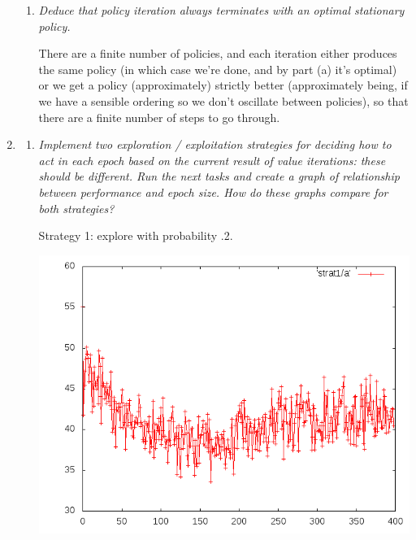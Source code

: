 \documentclass{article}
\begin{document}
\begin{enumerate}
\begin{enumerate}

  \item \emph{Deduce that policy iteration always terminates with an
    optimal stationary policy.}
    
    There are a finite number of policies, and each iteration either
    produces the same policy (in which case we're done, and by part
    (a) it's optimal) or we get a policy (approximately) strictly
    better (approximately being, if we have a sensible ordering so we
    don't oscillate between policies), so that there are a finite
    number of steps to go through.
  \end{enumerate}

\item 
  \begin{enumerate}
  \item \emph{Implement two exploration / exploitation strategies for
    deciding how to act in each epoch based on the current result of
    value iterations: these should be different.  Run the next tasks
    and create a graph of relationship between performance and epoch
    size. How do these graphs compare for both strategies?}

    Strategy 1: explore with probability .2.

    \begin{center}
      \includegraphics[scale=.4]{strat1.png}
    \end{center}


\end{enumerate}
\end{enumerate}
\end{document}
